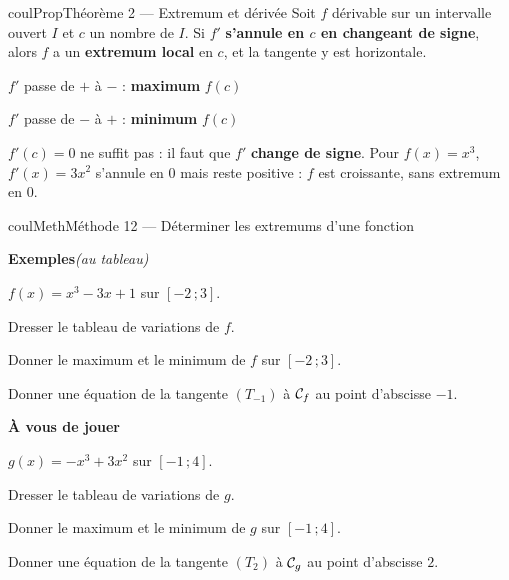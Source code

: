 \documentclass[11pt,a4paper]{article}
\makeatletter
\newcommand{\lycee@intff}[2]{\left[#1\,;#2\right]}
\providecommand{\Cf}{\mathcal{C}\sb{f}}%
\providecommand{\Cg}{\mathcal{C}\sb{g}}%
\providecommand{\intff}{\lycee@intff}%
\newcounter{lycee@signet}
\newcommand{\signet}[3][]{\stepcounter{lycee@signet}%
  \edef\lycee@dest{\if\relax\detokenize{#1}\relax
    signet.\arabic{lycee@signet}\else#1\fi}%
  \hypertarget{\lycee@dest}{}\bookmark[level=#2,dest=\lycee@dest]{#3}}
\newcounter{methode}
\newenvironment{proprietebox}[1][Propriété]%
  {\begin{boitecours}[phantom={\signet{2}{#1}}]{coulProp}{#1}}{\end{boitecours}}
\newenvironment{methodebox}[1][Méthode]{\stepcounter{methode}%
  \begin{boitecours}[phantom={\signet[methode-\arabic{methode}]{2}{#1}}]{coulMeth}{#1}}%
  {\end{boitecours}}
\newcommand{\etape}[1]{\par\smallskip\textbf{\color{coulMeth}#1}\par\nobreak\smallskip}
\newcommand{\autableau}{\hfill{\footnotesize\itshape\color{black!45}(au tableau)}}
\newcommand{\etapeexemples}{%
    \par\smallskip\textbf{\color{coulMeth}Exemples}\autableau\par\nobreak\smallskip}
\makeatother
\begin{document}
\begin{proprietebox}[Théorème 2 --- Extremum et dérivée]
Soit $f$ dérivable sur un intervalle ouvert $I$ et $c$ un nombre de $I$. Si $f'$
\textbf{s'annule en $c$ en changeant de signe}, alors $f$ a un \textbf{extremum local} en
$c$, et la tangente y est horizontale.

\smallskip
\begin{minipage}[t]{0.48\linewidth}\centering
{\small $f'$ passe de $+$ à $-$ : \textbf{maximum} $f(c)$}\\[4pt]
\end{minipage}\hfill
\begin{minipage}[t]{0.48\linewidth}\centering
{\small $f'$ passe de $-$ à $+$ : \textbf{minimum} $f(c)$}\\[4pt]
\end{minipage}
\end{proprietebox}

\begin{remarquebox}[Attention]
$f'(c)=0$ ne suffit pas : il faut que $f'$ \textbf{change de signe}. Pour $f(x)=x^{3}$,
$f'(x)=3x^{2}$ s'annule en $0$ mais reste positive : $f$ est croissante, sans extremum
en $0$.
\end{remarquebox}

\begin{methodebox}[Méthode 12 --- Déterminer les extremums d'une fonction]
\etapeexemples
$f(x)=x^{3}-3x+1$ sur $\intff{-2}{3}$.
\begin{questions}[label=\alph*)]
  \item Dresser le tableau de variations de $f$.
  \item Donner le maximum et le minimum de $f$ sur $\intff{-2}{3}$.
  \item Donner une équation de la tangente $(T_{-1})$ à $\Cf$ au point d'abscisse $-1$.
\end{questions}

\etape{À vous de jouer}
$g(x)=-x^{3}+3x^{2}$ sur $\intff{-1}{4}$.
\begin{questions}
  \item Dresser le tableau de variations de $g$.
  \item Donner le maximum et le minimum de $g$ sur $\intff{-1}{4}$.
  \item Donner une équation de la tangente $(T_2)$ à $\Cg$ au point d'abscisse $2$.
\end{questions}

\end{methodebox}
\end{document}
